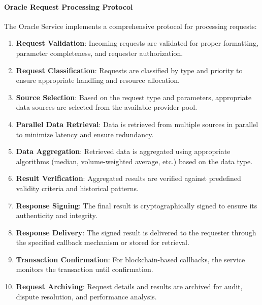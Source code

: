 \paragraph{Oracle Request Processing Protocol}
The Oracle Service implements a comprehensive protocol for processing requests:

\begin{enumerate}
    \item \textbf{Request Validation}: Incoming requests are validated for proper formatting, parameter completeness, and requester authorization.
    
    \item \textbf{Request Classification}: Requests are classified by type and priority to ensure appropriate handling and resource allocation.
    
    \item \textbf{Source Selection}: Based on the request type and parameters, appropriate data sources are selected from the available provider pool.
    
    \item \textbf{Parallel Data Retrieval}: Data is retrieved from multiple sources in parallel to minimize latency and ensure redundancy.
    
    \item \textbf{Data Aggregation}: Retrieved data is aggregated using appropriate algorithms (median, volume-weighted average, etc.) based on the data type.
    
    \item \textbf{Result Verification}: Aggregated results are verified against predefined validity criteria and historical patterns.
    
    \item \textbf{Response Signing}: The final result is cryptographically signed to ensure its authenticity and integrity.
    
    \item \textbf{Response Delivery}: The signed result is delivered to the requester through the specified callback mechanism or stored for retrieval.
    
    \item \textbf{Transaction Confirmation}: For blockchain-based callbacks, the service monitors the transaction until confirmation.
    
    \item \textbf{Request Archiving}: Request details and results are archived for audit, dispute resolution, and performance analysis.
\end{enumerate}

